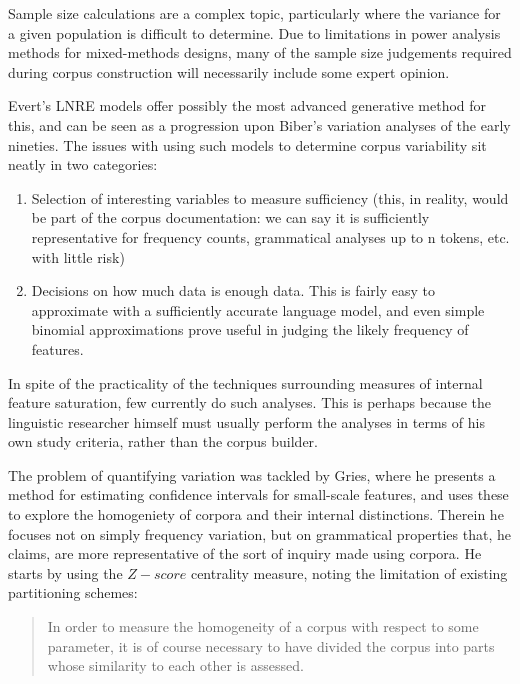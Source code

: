 Sample size calculations are a complex topic, particularly where the variance for a given population is difficult to determine.  Due to limitations in power analysis methods for mixed-methods designs, many of the sample size judgements required during corpus construction will necessarily include some expert opinion.

Evert's LNRE models offer possibly the most advanced generative method for this\cite{evert2007zipfr}, and can be seen as a progression upon Biber's variation analyses of the early nineties.  The issues with using such models to determine corpus variability sit neatly in two categories:

\begin{enumerate}
 \item Selection of interesting variables to measure sufficiency (this, in reality, would be part of the corpus documentation: we can say it is sufficiently representative for frequency counts, grammatical analyses up to n tokens, etc. with little risk)
 \item Decisions on how much data is enough data.  This is fairly easy to approximate with a sufficiently accurate language model, and even simple binomial approximations prove useful in judging the likely frequency of features.
\end{enumerate}

In spite of the practicality of the techniques surrounding measures of internal feature saturation, few currently do such analyses.  This is perhaps because the linguistic researcher himself must usually perform the analyses in terms of his own study criteria, rather than the corpus builder.

The problem of quantifying variation was tackled by Gries\cite{gries2006exploring}, where he presents a method for estimating confidence intervals for small-scale features, and uses these to explore the homogeniety of corpora and their internal distinctions.  Therein he focuses not on simply frequency variation, but on grammatical properties that, he claims, are more representative of the sort of inquiry made using corpora.  He starts by using the $Z-score$ centrality measure, noting the limitation of existing partitioning schemes\cite[p.123]{gries2006exploring}:

\begin{quote}
In order to measure the homogeneity of a corpus with respect to some parameter, it is of course necessary to have divided the corpus into parts whose similarity to each other is assessed. 
\end{quote}

